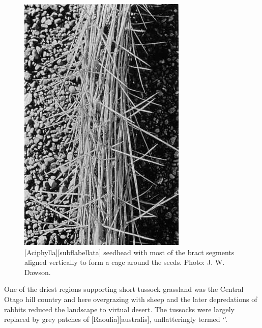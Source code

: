 \begin{figure}[t]
\begin{minipage}[t]{\textwidth}
\begin{minipage}[t]{(\textwidth-\fgap) * \real{0.477}}
			\includegraphics[width=\textwidth]{graphics/figure85aciphylla-seedhead.jpg}
			\caption[\emph{Aciphylla subflabellata} seedhead]{[Aciphylla][subflabellata] seedhead with most of the bract segments aligned vertically to form a cage around the seeds.
			Photo:  J. W. Dawson.}%
			\label{fig:85aciphylla-seedhead}
		\end{minipage}
	\end{minipage}
\end{figure}

One of the driest regions supporting short tussock grassland was the Central Otago hill country and here overgrazing with sheep and the later depredations of rabbits reduced the landscape to virtual desert.
The tussocks were largely replaced by grey patches of [Raoulia][australis], unflatteringly termed `'.

